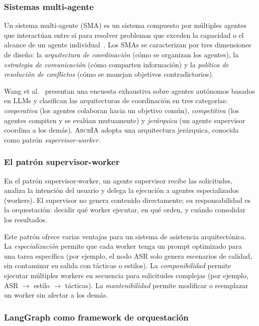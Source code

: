 \documentclass[12pt, letterpaper, oneside]{article}
\newcommand{\archia}{\textsc{ArchIA}}
\begin{document}
\subsubsection{Sistemas multi-agente}

Un sistema multi-agente (SMA) es un sistema compuesto por múltiples agentes que
interactúan entre sí para resolver problemas que exceden la capacidad o el alcance
de un agente individual~\cite{wooldridge2009introduction}. Los SMAs se caracterizan
por tres dimensiones de diseño: la \emph{arquitectura de coordinación} (cómo se
organizan los agentes), la \emph{estrategia de comunicación} (cómo comparten
información) y la \emph{política de resolución de conflictos} (cómo se manejan
objetivos contradictorios).

Wang et al.~\cite{wang2023survey} presentan una encuesta exhaustiva sobre agentes
autónomos basados en LLMs y clasifican las arquitecturas de coordinación en tres
categorías: \emph{cooperativa} (los agentes colaboran hacia un objetivo común),
\emph{competitiva} (los agentes compiten y se evalúan mutuamente) y
\emph{jerárquica} (un agente supervisor coordina a los demás). \archia{} adopta
una arquitectura jerárquica, conocida como patrón \emph{supervisor-worker}.

\subsubsection{El patrón supervisor-worker}

En el patrón supervisor-worker, un agente supervisor recibe las solicitudes,
analiza la intención del usuario y delega la ejecución a agentes especializados
(workers). El supervisor no genera contenido directamente; su responsabilidad es
la orquestación: decidir qué worker ejecutar, en qué orden, y cuándo consolidar
los resultados.

Este patrón ofrece varias ventajas para un sistema de asistencia arquitectónica.
La \emph{especialización} permite que cada worker tenga un prompt optimizado
para una tarea específica (por ejemplo, el nodo ASR solo genera escenarios de
calidad, sin contaminar su salida con tácticas o estilos). La
\emph{componibilidad} permite ejecutar múltiples workers en secuencia para
solicitudes complejas (por ejemplo, ASR $\rightarrow$ estilo $\rightarrow$
tácticas). La \emph{mantenibilidad} permite modificar o reemplazar un worker
sin afectar a los demás.

\subsubsection{LangGraph como framework de orquestación}
\end{document}
